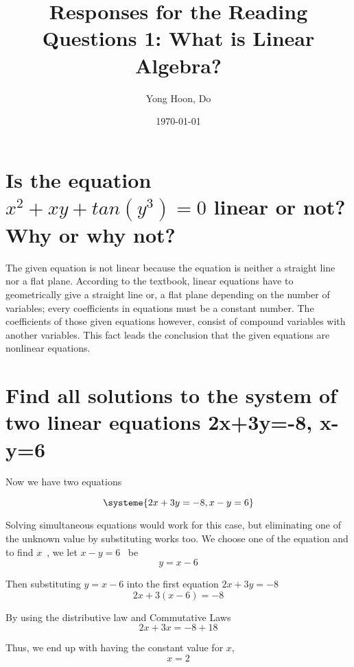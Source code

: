 \documentclass{article}
\title{Responses for the Reading Questions 1: What is Linear Algebra?}
\author{Yong Hoon, Do}
\date{\today}
\begin{document}
\maketitle


\section{Is the equation $x^2+xy+tan(y^3)=0$ linear or not? Why or why not?}

The given equation is not linear because the equation is neither a straight line nor a flat plane. According to the textbook, linear equations have to geometrically give a straight line or, a flat plane depending on the number of variables; every coefficients in equations must be a constant number. The coefficients of those given equations however, consist of compound variables with another variables. This fact leads the conclusion that the given equations are nonlinear equations.


\section{Find all solutions to the system of two linear equations 2x+3y=-8, x-y=6}

Now we have two equations

\[
\systeme{
  2x+3y=-8,
  x-y=6
}
\]

\bigskip

Solving simultaneous equations would work for this case, but eliminating one of the unknown value by substituting works too. We choose one of the equation and to find $x$~, we let $x-y=6$~ be
\begin{equation}
y=x-6
\end{equation}

Then substituting $y=x-6$ into the first equation $2x+3y=-8$
\begin{equation}
2x+3(x-6)=-8
\end{equation}

By using the distributive law and Commutative Laws
\begin{equation}
2x+3x=-8+18
\end{equation}

Thus, we end up with having the constant value for $x$,
\begin{equation}
x=2
\end{equation}
\end{document}
